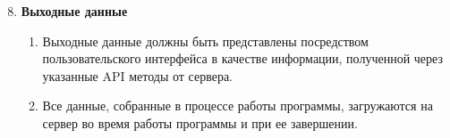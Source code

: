 \renewcommand{\labelenumi}{\textbf{FR-\arabic{enumi}}.}

\renewcommand{\labelenumii}{\textbf{FR-\arabic{enumi}.\arabic{enumii}}.}

\renewcommand{\labelenumiii}{\arabic{enumiii}.}
\begin{enumerate}
	\setcounter{enumi}{7}
	\item \textbf{Выходные данные}
	\begin{enumerate}
		\item Выходные данные должны быть представлены посредством пользовательского интерфейса в качестве информации, полученной через указанные API методы от сервера. 
		\item Все данные, собранные в процессе работы программы, загружаются на сервер во время работы программы и при ее завершении. 
	\end{enumerate}
\end{enumerate}
\renewcommand{\labelenumi}{\arabic{enumi}.}

\renewcommand{\labelenumii}{\arabic{enumii}.}

\renewcommand{\labelenumiii}{\arabic{enumiii}.}
